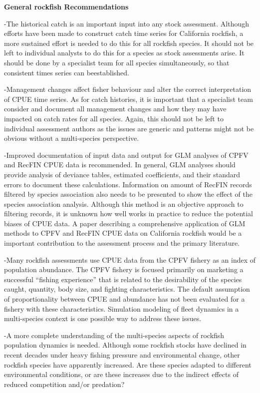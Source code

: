 \documentclass[11pt,
  english,
  a4paper,
]{article}
\begin{document}
\textbf{General rockfish Recommendations}

-The historical catch is an important input into any stock assessment. Although efforts have been made to construct catch time series for California rockfish, a more sustained effort is needed to do this for all rockfish species. It should not be left to individual analysts to do this for a species as stock assessments arise. It should be done by a specialist team for all species simultaneously, so that consistent times series can beestablished.

-Management changes affect fisher behaviour and alter the correct interpretation of CPUE time series. As for catch histories, it is important that a specialist team consider and document all management changes and how they may have impacted on catch rates for all species. Again, this should not be left to individual assessment authors as the issues are generic and patterns might not be obvious without a multi-species perspective.

-Improved documentation of input data and output for GLM analyses of CPFV and RecFIN CPUE data is recommended. In general, GLM analyses should provide analysis of deviance tables, estimated coefficients, and their standard errors to document these calculations. Information on amount of RecFIN records filtered by species association also needs to be presented to show the effect of the species association analysis. Although this method is an objective approach to filtering records, it is unknown how well works in practice to reduce the potential biases of CPUE data. A paper describing a comprehensive application of GLM methods to CPFV and RecFIN CPUE data on California rockfish would be a important contribution to the assessment process and the primary literature.

-Many rockfish assessments use CPUE data from the CPFV fishery as an index of population abundance. The CPFV fishery is focused primarily on marketing a successful ``fishing experience'' that is related to the desirability of the species caught, quantity, body size, and fighting characteristics. The default assumption of proportionality between CPUE and abundance has not been evaluated for a fishery with these characteristics. Simulation modeling of fleet dynamics in a multi-species context is one possible way to address these issues.

-A more complete understanding of the multi-species aspects of rockfish population dynamics is needed. Although some rockfish stocks have declined in recent decades under heavy fishing pressure and environmental change, other rockfish species have apparently increased. Are these species adapted to different environmental conditions, or are these increases due to the indirect effects of reduced competition and/or predation?
\end{document}
